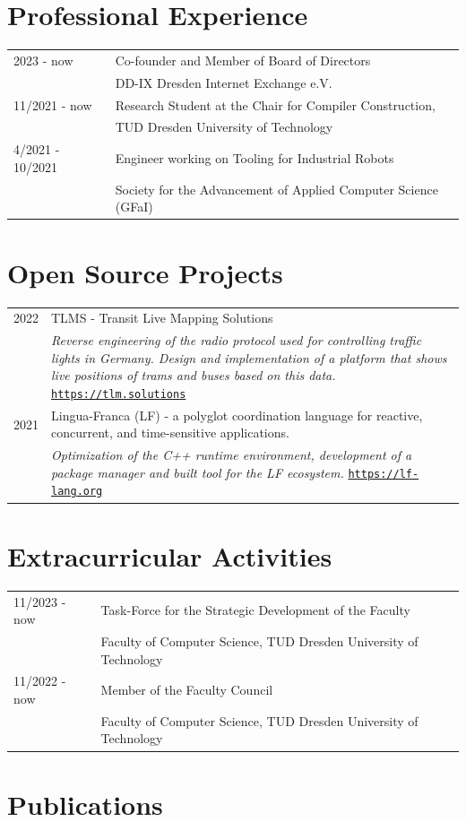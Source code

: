 \documentclass[11pt, a4paper, oneside]{article}
\begin{document}
\section*{Professional Experience}

\begin{tabular}{R{3cm} L{12cm}}
	2023 	- now				& Co-founder and Member of Board of Directors \\ & DD-IX Dresden Internet Exchange e.V. \\
	11/2021 	- now			& Research Student at the Chair for Compiler Construction, \\ 
										& TUD Dresden University of Technology \\ 
	4/2021 - 10/2021    & Engineer working on Tooling for Industrial Robots \\ 
										& Society for the Advancement of Applied Computer Science (GFaI)
\end{tabular}

\section*{Open Source Projects}

\begin{tabular}{R{3cm} L{13cm}}
	2022 							    & TLMS - Transit Live Mapping Solutions \\
	  										&	\emph{Reverse engineering of the radio protocol used for controlling traffic lights in Germany. Design and implementation of a platform that shows live positions of trams and buses based on this data.} \href{https://map.tlm.solutions}{\texttt{https://tlm.solutions}}  \\  
		2021 							& Lingua-Franca (LF) - a polyglot coordination language for reactive, concurrent, and time-sensitive applications.  \\ 
											& \emph{Optimization of the C++ runtime environment, development  of  a package manager and built tool for the LF ecosystem.} \href{https://lf-lang.org}{\texttt{https://lf-lang.org}} \\
\end{tabular}

\section*{Extracurricular Activities}

\begin{tabular}{R{3cm} L{13cm}}
	11/2023 - now   	& Task-Force for the Strategic Development of the Faculty \\ 
									& Faculty of Computer Science, TUD Dresden University of Technology  \\
	11/2022 - now 	    & Member of the Faculty Council \\ 
									& Faculty of Computer Science, TUD Dresden University of Technology 
\end{tabular}


\section*{Publications}

\nocite{*} 

{}
\end{document}
